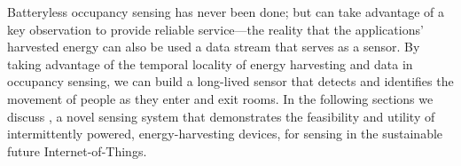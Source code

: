 Batteryless occupancy sensing has never been done; but can take advantage of a key observation to provide reliable service---the reality that the applications' harvested energy can also be used a data stream that serves as a sensor.
By taking advantage of the temporal locality of energy harvesting and data in occupancy sensing, we can build a long-lived sensor that detects and identifies the movement of people as they enter and exit rooms.
In the following sections we discuss \sysname, a novel sensing system that demonstrates the feasibility and utility of intermittently powered, energy-harvesting devices, for sensing in the sustainable future Internet-of-Things.
